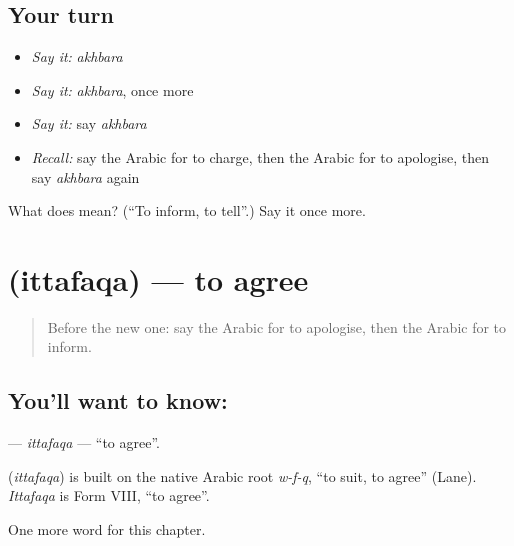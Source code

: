 \subsection*{Your turn}
\begin{itemize}
\raggedright
  \item \emph{Say it:} \emph{akhbara}
  \item \emph{Say it:} \emph{akhbara}, once more
  \item \emph{Say it:} say \emph{akhbara}
  \item \emph{Recall:} say the Arabic for to charge, then the Arabic for to apologise, then say \emph{akhbara} again
\end{itemize}

\begin{tcolorbox}[breakable,colback=teal!4,colframe=teal!35!black,title={Before you move on}]
What does  mean? (\textquotedblleft{}To inform, to tell\textquotedblright{}.) Say it once more.
\end{tcolorbox}
\section[\texorpdfstring{\ar{اتفق} (ittafaqa)}{اتفق (ittafaqa)}]{ (ittafaqa) — to agree}

\label{lesson:AR-C226-ittafaqa}



\begin{quote}
Before the new one: say the Arabic for to apologise, then the Arabic for to inform.
\end{quote}

\subsection*{You'll want to know: }
\textbf{} — \emph{ittafaqa} — \textquotedblleft{}to agree\textquotedblright{}.

\begin{cousinweb}
\textbf{} (\emph{ittafaqa}) is built on the native Arabic root \emph{w-f-q}, \textquotedblleft{}to suit, to agree\textquotedblright{} (Lane). \emph{Ittafaqa} is Form VIII, \textquotedblleft{}to agree\textquotedblright{}.
\end{cousinweb}

\begin{grammarlens}[title={What you've built}]
One more word for this chapter.
\end{grammarlens}

